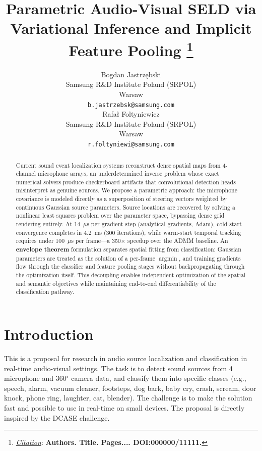 \documentclass{article}
\title{Parametric Audio-Visual SELD via Variational Inference and Implicit Feature Pooling
\thanks{\textit{\underline{Citation}}: 
\textbf{Authors. Title. Pages.... DOI:000000/11111.}} 
}
\author{
  Bogdan Jastrzębski \\
  Samsung R\&D Institute Poland (SRPOL) \\
  Warsaw \\
  \texttt{b.jastrzebsk@samsung.com} \\
  \AND
  Rafał Foltyniewicz \\
  Samsung R\&D Institute Poland (SRPOL) \\
  Warsaw \\
  \texttt{r.foltyniewi@samsung.com} \\
}
\begin{document}
\maketitle


\begin{abstract}
Current sound event localization systems reconstruct dense spatial maps from 4-channel microphone arrays, an underdetermined inverse problem whose exact numerical solvers produce checkerboard artifacts that convolutional detection heads misinterpret as genuine sources. We propose a parametric approach: the microphone covariance is modeled directly as a superposition of steering vectors weighted by continuous Gaussian source parameters. Source locations are recovered by solving a nonlinear least squares problem over the parameter space, bypassing dense grid rendering entirely. At 14~$\mu$s per gradient step (analytical gradients, Adam), cold-start convergence completes in 4.2~ms (300 iterations), while warm-start temporal tracking requires under 100~$\mu$s per frame---a 350$\times$ speedup over the ADMM baseline. An \textbf{envelope theorem} formulation separates spatial fitting from classification: Gaussian parameters are treated as the solution of a per-frame $\operatorname{argmin}$, and training gradients flow through the classifier and feature pooling stages without backpropagating through the optimization itself. This decoupling enables independent optimization of the spatial and semantic objectives while maintaining end-to-end differentiability of the classification pathway.
\end{abstract}




\section{Introduction}
This is a proposal for research in audio source localization and classification in real-time audio-visual settings. The task is to detect sound sources from 4 microphone and 360$^\circ$ camera data, and classify them into specific classes (e.g., speech, alarm, vacuum cleaner, footsteps, dog bark, baby cry, crash, scream, door knock, phone ring, laughter, cat, blender). The challenge is to make the solution fast and possible to use in real-time on small devices. The proposal is directly inspired by the DCASE challenge.
\end{document}
